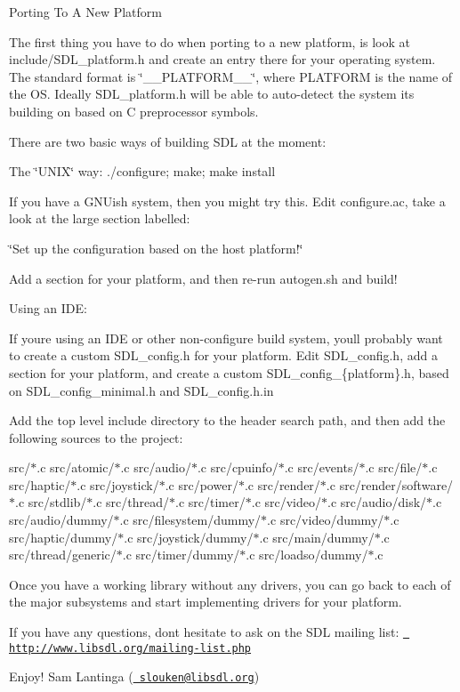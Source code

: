 
\begin{DoxyItemize}
\item Porting To A New Platform

The first thing you have to do when porting to a new platform, is look at include/\+SDL\+\_\+platform.\+h and create an entry there for your operating system. The standard format is \char`\"{}\+\_\+\+\_\+\+PLATFORM\+\_\+\+\_\+\char`\"{}, where PLATFORM is the name of the OS. Ideally SDL\+\_\+platform.\+h will be able to auto-\/detect the system it\textquotesingle{}s building on based on C preprocessor symbols.
\end{DoxyItemize}

There are two basic ways of building SDL at the moment\+:


\begin{DoxyEnumerate}
\item The \char`\"{}\+UNIX\char`\"{} way\+: ./configure; make; make install

If you have a GNUish system, then you might try this. Edit configure.\+ac, take a look at the large section labelled\+:

\char`\"{}\+Set up the configuration based on the host platform!\char`\"{}

Add a section for your platform, and then re-\/run autogen.\+sh and build!
\item Using an IDE\+:

If you\textquotesingle{}re using an IDE or other non-\/configure build system, you\textquotesingle{}ll probably want to create a custom SDL\+\_\+config.\+h for your platform. Edit SDL\+\_\+config.\+h, add a section for your platform, and create a custom SDL\+\_\+config\+\_\+\{platform\}.h, based on SDL\+\_\+config\+\_\+minimal.\+h and SDL\+\_\+config.\+h.\+in

Add the top level include directory to the header search path, and then add the following sources to the project\+:

src/$\ast$.c src/atomic/$\ast$.c src/audio/$\ast$.c src/cpuinfo/$\ast$.c src/events/$\ast$.c src/file/$\ast$.c src/haptic/$\ast$.c src/joystick/$\ast$.c src/power/$\ast$.c src/render/$\ast$.c src/render/software/$\ast$.c src/stdlib/$\ast$.c src/thread/$\ast$.c src/timer/$\ast$.c src/video/$\ast$.c src/audio/disk/$\ast$.c src/audio/dummy/$\ast$.c src/filesystem/dummy/$\ast$.c src/video/dummy/$\ast$.c src/haptic/dummy/$\ast$.c src/joystick/dummy/$\ast$.c src/main/dummy/$\ast$.c src/thread/generic/$\ast$.c src/timer/dummy/$\ast$.c src/loadso/dummy/$\ast$.c
\end{DoxyEnumerate}

Once you have a working library without any drivers, you can go back to each of the major subsystems and start implementing drivers for your platform.

If you have any questions, don\textquotesingle{}t hesitate to ask on the SDL mailing list\+: \href{http://www.libsdl.org/mailing-list.php}{\texttt{ http\+://www.\+libsdl.\+org/mailing-\/list.\+php}}

Enjoy! Sam Lantinga (\href{mailto:slouken@libsdl.org}{\texttt{ slouken@libsdl.\+org}}) 